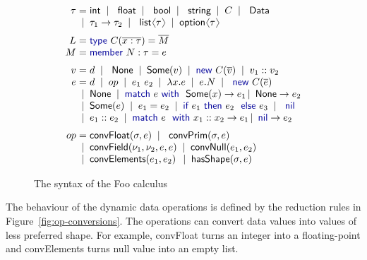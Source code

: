 \documentclass[10pt,preprint,blind,clearpagebib]{sigplanconf}
\newcommand{\langl}{\begin{picture}(4.5,7)
\put(1.1,2.5){\rotatebox{60}{\line(1,0){5.5}}}
\put(1.1,2.5){\rotatebox{300}{\line(1,0){5.5}}}
\end{picture}}
\newcommand{\rangl}{\begin{picture}(4.5,7)
\put(.9,2.5){\rotatebox{120}{\line(1,0){5.5}}}
\put(.9,2.5){\rotatebox{240}{\line(1,0){5.5}}}
\end{picture}}
\newcommand{\kvd}[1]{\textnormal{\textcolor{kvdclr}{\sffamily #1}}}
\newcommand{\num}[1]{\textnormal{\textcolor{numclr}{\sffamily #1}}}
\newcommand{\ident}[1]{\textnormal{\sffamily #1}}
\newcommand{\lsep}[0]{\;\; | \;\;}
\newcommand{\narrow}[1]{\hspace{-0.7em} #1 \hspace{-0.7em}}
\begin{document}

\begin{figure}[!h]
\noindent
\begin{equation*}
\begin{array}{rcl}
 \tau &\narrow{=}& \ident{int} \lsep \ident{float} \lsep \ident{bool} \lsep \ident{string} \lsep C \lsep \ident{Data} \\[0.0em]
      &\narrow{|}& \tau_1 \rightarrow \tau_2 \lsep \ident{list}\langl\tau\rangl \lsep \ident{option}\langl\tau\rangl 
\\[0.6em]
 L &\narrow{=}& \kvd{type}~C(\overline{x:\tau}) = \overline{M} \\[0.0em]
 M &\narrow{=}& \kvd{member}~N:\tau= e
\\[0.6em]
 v &\narrow{=}& d \lsep \ident{None} \lsep \ident{Some}(v) \lsep \kvd{new}~C(\overline{v}) \lsep v_1::v_2 \\[0.0em]
 e &\narrow{=}& d \lsep op \lsep e_1~e_2 \lsep \lambda x.e \lsep e.N \lsep \kvd{new}~C(\overline{e}) \\
   &\narrow{|}& \ident{None} \lsep\kvd{match}~e~\kvd{with}~\ident{Some}(x) \rightarrow e_1 \,|\, \ident{None} \rightarrow e_2 \\
   &\narrow{|}& \ident{Some}(e) \lsep e_1 = e_2 \lsep {\kvd{if}~e_1~\kvd{then}~e_2~\kvd{else}~e_3} \lsep \kvd{nil} \\
   &\narrow{|}& e_1 :: e_2 \lsep \kvd{match}~e~\kvd{with}~x_1::x_2 \rightarrow e_1 \,|\, \kvd{nil} \rightarrow e_2 
\\[0.6em]
op &\narrow{=}& \ident{convFloat}(\sigma, e) \lsep \ident{convPrim}(\sigma, e) \\
   &\narrow{|}& \ident{convField}(\nu_1, \nu_2, e, e) \lsep \ident{convNull}(e_1, e_2) \\
   &\narrow{|}& \ident{convElements}(e_1, e_2) \,\lsep \ident{hasShape}(\sigma, e) 
\end{array}
\end{equation*}

\caption{The syntax of the Foo calculus}
\label{fig:foo-syntax}
\vspace{-0.5em}
\end{figure}


The behaviour of the dynamic data operations is defined by the reduction rules in 
Figure~\ref{fig:op-conversions}. The operations can convert data values into values of 
less preferred shape. For example, \ident{convFloat} turns an integer \num{1} into 
a floating-point \num{1.0} and \ident{convElements} turns \kvd{null} value into an empty list.
\end{document}
